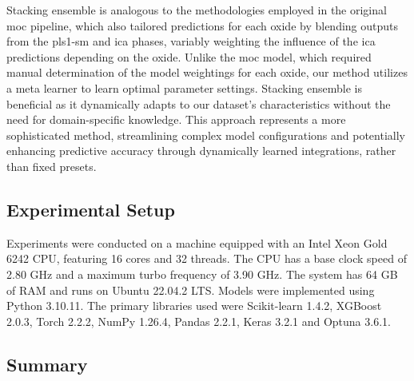 Stacking ensemble is analogous to the methodologies employed in the original \gls{moc} pipeline, which also tailored predictions for each oxide by blending outputs from the \gls{pls1-sm} and \gls{ica} phases, variably weighting the influence of the \gls{ica} predictions depending on the oxide.
Unlike the \gls{moc} model, which required manual determination of the model weightings for each oxide, our method utilizes a meta learner to learn optimal parameter settings.
Stacking ensemble is beneficial as it dynamically adapts to our dataset's characteristics without the need for domain-specific knowledge.
This approach represents a more sophisticated method, streamlining complex model configurations and potentially enhancing predictive accuracy through dynamically learned integrations, rather than fixed presets.


\subsection{Experimental Setup}
Experiments were conducted on a machine equipped with an Intel Xeon Gold 6242 CPU, featuring 16 cores and 32 threads.
The CPU has a base clock speed of 2.80 GHz and a maximum turbo frequency of 3.90 GHz.
The system has 64 GB of RAM and runs on Ubuntu 22.04.2 LTS.
Models were implemented using Python 3.10.11.
The primary libraries used were Scikit-learn 1.4.2, XGBoost 2.0.3, Torch 2.2.2, NumPy 1.26.4, Pandas 2.2.1, Keras 3.2.1 and Optuna 3.6.1.




\subsection{Summary}
